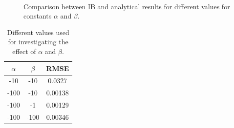 \begin{figure}[H]
	\centering
	\quad
	\\
	\quad
	\caption{Comparison between IB and analytical results for different values for constants $\alpha$ and $\beta$.}
	\label{fig:C3_virtualBoundaryResultConstant}
\end{figure}

\begin{table}[H]
\centering
\begin{tabular}{c | c | c}
	 $\alpha$ & $\beta$ & RMSE \\ \hline \hline
	 -10 & -10 & 0.0327 \\ \hline
	 -100 & -10 & 0.00138 \\ \hline
	 -100 & -1 & 0.00129 \\ \hline
	 -100 & -100 & 0.00346 \\
\end{tabular}
\caption{Different values used for investigating the effect of $\alpha$ and $\beta$.}
\label{table:C3_virtualBoundaryResultConstantRSME}
\end{table}
